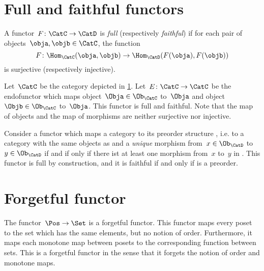 

\section{Full and faithful functors}
\begin{ctdefinition}
    \label{def:functorfullfaith}
    A functor~$F\colon \CatC \to \CatD$ is \emph{full} (respectively \emph{faithful}) if for each pair of objects~$\obja,\objb\in \CatC$, the function
    \begin{equation}
        F\colon \Hom_\CatC(\obja,\objb)\to \Hom_\CatD(F(\obja),F(\objb))
    \end{equation}
    is surjective (respectively injective).
\end{ctdefinition}

\begin{example}
    Let~$\CatC$ be the category depicted in \cref{fig:ex_full_faithful_1}. Let~$E\colon \CatC\to \CatC$ be the endofunctor which maps object~$\Obja\in \Ob_{\CatC}$ to~$\Obja$ and object~$\Objb\in \Ob_{\CatC}$ to~$\Obja$. This functor is full and faithful. Note that the map of objects and the map of morphisms are neither surjective nor injective.

    \begin{figure}[h!]
        \centering
        \caption{\label{fig:ex_full_faithful_1}}
    \end{figure}
\end{example}

\begin{example}
    Consider a functor which maps a category \CatC to its preorder structure \CatD, i.e. to a category with the same objects as \CatC and a \emph{unique} morphism from~$x\in \Ob_\CatD$ to~$y\in \Ob_\CatD$ if and if only if there ist at least one morphism from~$x$ to~$y$ in \CatC. This functor is full by construction, and it is faithful if and only if \CatC is a preorder.
    \end{example}


\section{Forgetful functor}


\begin{example}
    The functor~$\Pos \to \Set$ is a forgetful functor. This functor maps every poset to the set which has the same elements, but no notion of order. Furthermore, it maps each monotone map between posets to the corresponding function between sets. This is a forgetful functor in the sense that it forgets the notion of order and monotone maps.
\end{example}

